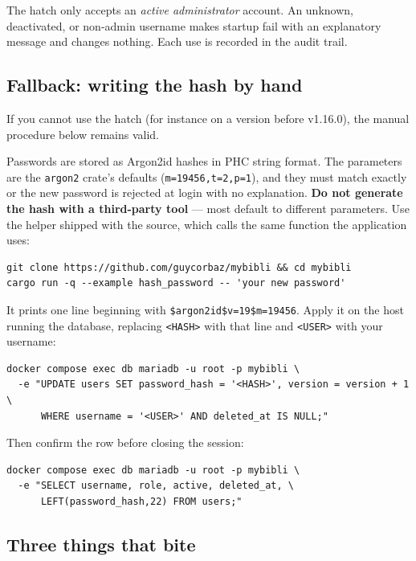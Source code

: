 The hatch only accepts an \emph{active administrator} account. An
unknown, deactivated, or non-admin username makes startup fail with an
explanatory message and changes nothing. Each use is recorded in the
audit trail.

\subsection*{Fallback: writing the hash by hand}

If you cannot use the hatch (for instance on a version before v1.16.0),
the manual procedure below remains valid.

Passwords are stored as Argon2id hashes in PHC string format. The
parameters are the \texttt{argon2} crate's defaults
(\texttt{m=19456,t=2,p=1}), and they must match exactly or the new
password is rejected at login with no explanation. \textbf{Do not
generate the hash with a third-party tool} — most default to different
parameters. Use the helper shipped with the source, which calls the same
function the application uses:

\begin{lstlisting}
git clone https://github.com/guycorbaz/mybibli && cd mybibli
cargo run -q --example hash_password -- 'your new password'
\end{lstlisting}

It prints one line beginning with \texttt{\$argon2id\$v=19\$m=19456}.
Apply it on the host running the database, replacing \texttt{<HASH>}
with that line and \texttt{<USER>} with your username:

\begin{lstlisting}
docker compose exec db mariadb -u root -p mybibli \
  -e "UPDATE users SET password_hash = '<HASH>', version = version + 1 \
      WHERE username = '<USER>' AND deleted_at IS NULL;"
\end{lstlisting}

Then confirm the row before closing the session:

\begin{lstlisting}
docker compose exec db mariadb -u root -p mybibli \
  -e "SELECT username, role, active, deleted_at, \
      LEFT(password_hash,22) FROM users;"
\end{lstlisting}

\subsection*{Three things that bite}

